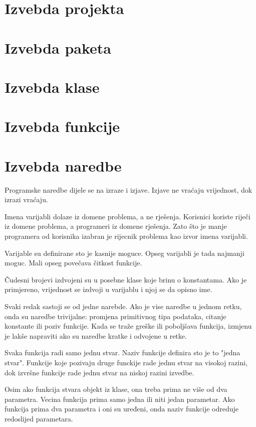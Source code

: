\documentclass[times, utf8, diplomski, numeric]{fer}
\begin{document}
\section{Izvebda projekta}

\section{Izvebda paketa}

\section{Izvebda klase}

\section{Izvebda funkcije}

\section{Izvebda naredbe}

Programske naredbe dijele se na izraze i izjave. Izjave ne vraćaju vrijednost, dok izrazi vraćaju. 



Imena varijabli dolaze iz domene problema, a ne rješenja. Korisnici koriste riječi iz domene problema, a programeri iz domene rješenja. Zato što je manje programera od korisnika izabran je rijecnik problema kao izvor imena varijabli.

Varijable su definirane sto je kasnije moguce. Opseg varijabli je tada najmanji moguc. Mali opseg povečava čitkost funkcije.

Čudesni brojevi izdvojeni su u posebne klase koje brinu o konstantama. Ako je primjereno, vrijednost se izdvoji u varijablu i njoj se da opisno ime.

Svaki redak sastoji se od jedne narebde. Ako je vise naredbe u jednom retku, onda su naredbe trivijalne: promjena primitivnog tipa podataka, citanje konstante ili poziv funkcije. Kada se traže greške ili poboljšava funkcija, izmjenu je lakše napraviti ako su naredbe kratke i odvojene u retke.

Svaka funkcija radi samo jednu stvar. Naziv funkcije definira sto je to "jedna stvar". Funkcije koje pozivaju druge funckije rade jednu stvar na visokoj razini, dok izvršne funkcije rade jednu stvar na niskoj razini izvedbe.

Osim ako funkcija stvara objekt iz klase, ona treba prima ne više od dva parametra. Vecina funkcija prima samo jedna ili niti jedan parametar. Ako funkcija prima dva parametra i oni su uređeni, onda naziv funkcije odreduje redoslijed parametara.
\end{document}
